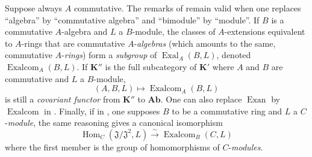 \begin{env}[18.4.2]
\label{0.18.4.2}
Suppose always $A$ commutative.
The remarks of  remain valid when one replaces ``algebra'' by ``commutative algebra'' and ``bimodule'' by ``module''.
If $B$ is a commutative $A$-algebra and $L$ a $B$-module, the classes of $A$-extensions equivalent to $A$-rings that are commutative $A$-\emph{algebras} (which amounts to the same, commutative $A$-\emph{rings}) form a \emph{subgroup} of $\operatorname{Exal}_A(B,L)$, denoted $\operatorname{Exalcom}_A(B,L)$.
If $\boldsymbol{K}''$ is the full subcategory of $\boldsymbol{K}'$ where $A$ and $B$ are commutative and $L$ a $B$-module,
\[
  (A,B,L)\mapsto\operatorname{Exalcom}_A(B,L)
\]
is still a \emph{covariant functor} from $\boldsymbol{K}''$ to $\boldsymbol{Ab}$.
One can also replace $\operatorname{Exan}$ by $\operatorname{Exalcom}$ in .
Finally, if in , one supposes $B$ to be a commutative ring and $L$ a $C$-\emph{module}, the same reasoning gives a canonical isomorphism
\begin{equation}
\tag{18.4.2.1}
  \label{0.18.4.2.1}
  \operatorname{Hom}_C(\mathfrak{J}/\mathfrak{J}^2,L)\xrightarrow{\sim}\operatorname{Exalcom}_B(C,L)
\end{equation}
where the first member is the group of homomorphisms of $C$-\emph{modules}.
\end{env}

